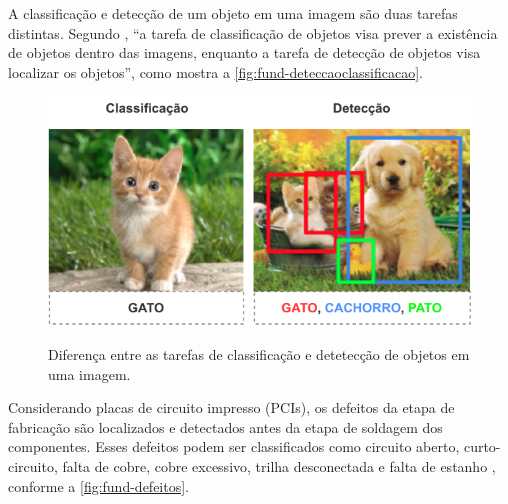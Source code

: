 A classificação e detecção de um objeto em uma imagem são duas tarefas distintas. Segundo , ``a tarefa de classificação de objetos visa prever a existência de objetos dentro das imagens, enquanto a tarefa de detecção de objetos visa localizar os objetos'', como mostra a \autoref{fig:fund-deteccaoclassificacao}.

\begin{figure}[h!] %
  \centering
  \caption{Diferença entre as tarefas de classificação e detetecção de objetos em uma imagem.}
  \includegraphics[scale=1.1]{img/img-fundamentacao-deteccaoclassificacao.pdf}
  \label{fig:fund-deteccaoclassificacao}
\end{figure}

Considerando placas de circuito impresso (PCIs), os defeitos da etapa de fabricação são localizados e detectados antes da etapa de soldagem dos componentes. Esses defeitos podem ser classificados como circuito aberto, curto-circuito, falta de cobre, cobre excessivo, trilha desconectada e falta de estanho \cite{ref:Ding-et-al}, conforme a \autoref{fig:fund-defeitos}.

